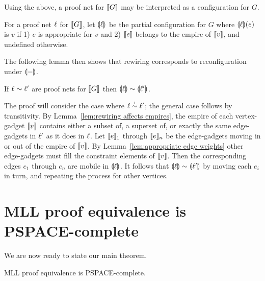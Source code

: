 \documentclass[conference]{IEEEtran}
\let\beforesection=\medskip
\let\aftersection=\noindent
\let\capsabbrev=\uppercase
\begin{document}
Using the above, a proof net for $\llbracket G\rrbracket$ may be interpreted as a configuration for $G$.



\begin{definition}
For a proof net $\ell$ for $\llbracket G\rrbracket$, let $\llparenthesis\ell\rrparenthesis$ be the partial configuration for $G$ where $\llparenthesis\ell\rrparenthesis(e)$ is $v$ if 1) $e$ is appropriate for $v$ and 2) $\llbracket e\rrbracket$ belongs to the empire of $\llbracket v\rrbracket$, and undefined otherwise.
\end{definition}


The following lemma then shows that rewiring corresponds to reconfiguration under $\llparenthesis-\rrparenthesis$.



\begin{lemma}
\label{lem:soundness}
If $\links\perm\links'$ are proof nets for $\llbracket G\rrbracket$ then $\coitn\links\perm\coitn{\links'}$.
\end{lemma}

\begin{IEEEproof}
The proof will consider the case where $\links\perm*\links'$; the general case follows by transitivity.
%
By Lemma~\ref{lem:rewiring affects empires}, the empire of each vertex-gadget $\llbracket v\rrbracket$ contains either a subset of, a superset of, or exactly the same edge-gadgets in $\ell'$ as it does in $\ell$.
%
Let $\llbracket e\rrbracket_1$ through $\llbracket e\rrbracket_n$ be the edge-gadgets moving in or out of the empire of $\llbracket v\rrbracket$.
%
By Lemma~\ref{lem:appropriate edge weights} other edge-gadgets must fill the constraint elements of $\llbracket v\rrbracket$.
%
Then the corresponding edges $e_1$ through $e_n$ are mobile in $\llparenthesis\ell\rrparenthesis$.
%
It follows that $\coitn\links\perm\coitn{\links'}$ by moving each $e_i$ in turn, and repeating the process for other vertices.
%
\end{IEEEproof}



\beforesection

\section{\capsabbrev{mll} proof equivalence is \capsabbrev{pspace}-complete}

\aftersection
%
We are now ready to state our main theorem.


\begin{theorem}
\capsabbrev{mll} proof equivalence is \capsabbrev{pspace}-complete.
\end{theorem}
\end{document}
